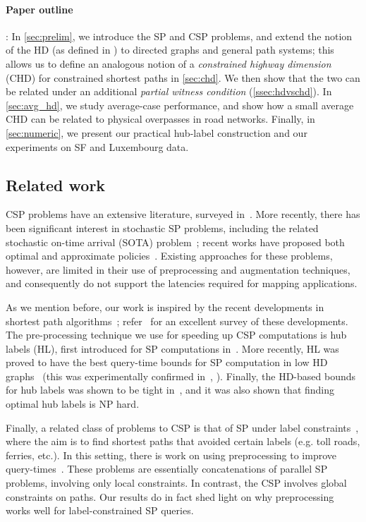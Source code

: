 \paragraph{Paper outline}:
In \cref{sec:prelim}, we introduce the SP and CSP problems, and extend the notion of the HD (as defined in \citep{highway2013}) to directed graphs and general path systems; this allows us to define an analogous notion of a \emph{constrained highway dimension} (CHD) for constrained shortest paths in \cref{sec:chd}. 
We then show that the two can be related under an additional \emph{partial witness condition} (\cref{ssec:hdvschd}). 
In \cref{sec:avg_hd}, we study average-case performance, and show how a small average CHD can be related to physical overpasses in road networks. 
Finally, in \cref{sec:numeric}, we present our practical hub-label construction and our experiments on SF and Luxembourg data.


\subsection{Related work}

CSP problems have an extensive literature, surveyed in~\citep{csp_survey}. 
More recently, there has been significant interest in stochastic SP problems, including the related stochastic on-time arrival (SOTA) problem~\citep{fan2005arriving}; recent works have proposed both optimal and approximate policies~\citep{sabran2014precomputation,nikolova_discretization}. 
Existing approaches for these problems, however, are limited in their use of preprocessing and augmentation techniques, and consequently do not support the latencies required for mapping applications.

As we mention before, our work is inspired by the recent developments in shortest path algorithms~\citep{highway2013,hubimplem,highway2010,dimacs09,geisberger_ch_definition,skeleton}; refer~\citep{goldberg_survey} for an excellent survey of these developments. 
The pre-processing technique we use for speeding up CSP computations is hub labels (HL), first introduced for SP computations in~\citep{cohen_definition_hl}. 
More recently, HL was proved to have the best query-time bounds for SP computation in low HD graphs~\citep{highway2013,highway2010} (this was experimentally confirmed in~\citep{hubimplem}, \cite[Figure 7]{goldberg_survey}).  
Finally, the HD-based bounds for hub labels was shown to be tight in~\citep{babenko_hl_complexity,white_complexity_hd}, and it was also shown that finding optimal hub labels is NP hard.

Finally, a related class of problems to CSP is that of SP under label constraints~\citep{language_csp}, where the aim is to find shortest paths that avoided certain labels (e.g. toll roads, ferries, etc.). 
In this setting, there is work on using preprocessing to improve query-times~\citep{rice_csp}.
These problems are essentially concatenations of parallel SP problems, involving only local constraints. 
In contrast, the CSP involves global constraints on paths.
Our results do in fact shed light on why preprocessing works well for label-constrained SP queries.